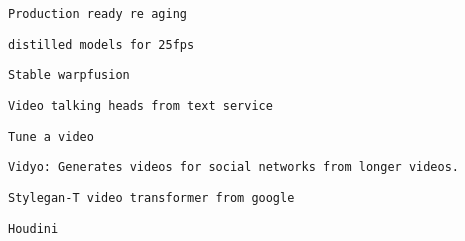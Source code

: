 \begin{verbatim}
Production ready re aging
\end{verbatim}
         

         
         
          \protect\hypertarget{ID_1794971568}{}{}

\begin{verbatim}
distilled models for 25fps
\end{verbatim}
         

         
         
          \protect\hypertarget{ID_1050055214}{}{}

\begin{verbatim}
Stable warpfusion
\end{verbatim}
         

         
         
          \protect\hypertarget{ID_837813814}{}{}

\begin{verbatim}
Video talking heads from text service
\end{verbatim}
         

         
         
          \protect\hypertarget{ID_1740764892}{}{}

\begin{verbatim}
Tune a video
\end{verbatim}
         

         
         
          \protect\hypertarget{ID_1276675577}{}{}

\begin{verbatim}
Vidyo: Generates videos for social networks from longer videos.
\end{verbatim}
         

         
         
          \protect\hypertarget{ID_456448062}{}{}

\begin{verbatim}
Stylegan-T video transformer from google
\end{verbatim}
         

         
         
          \protect\hypertarget{ID_599575488}{}{}

\begin{verbatim}
Houdini
\end{verbatim}
         
       

